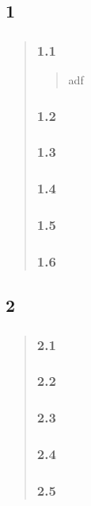 \subsection*{1}
\begin{quote}
    \subsubsection*{1.1}
    \begin{quote}
        adf
    \end{quote}
    \subsubsection*{1.2}
    \subsubsection*{1.3}
    \subsubsection*{1.4}
    \subsubsection*{1.5}
    \subsubsection*{1.6}
\end{quote}

\subsection*{2}
\begin{quote}
    \subsubsection*{2.1}
    \subsubsection*{2.2}
    \subsubsection*{2.3}
    \subsubsection*{2.4}
    \begin{quote}
        
    \end{quote}
    \subsubsection*{2.5}
    \begin{quote}
        
    \end{quote}
\end{quote}
    
